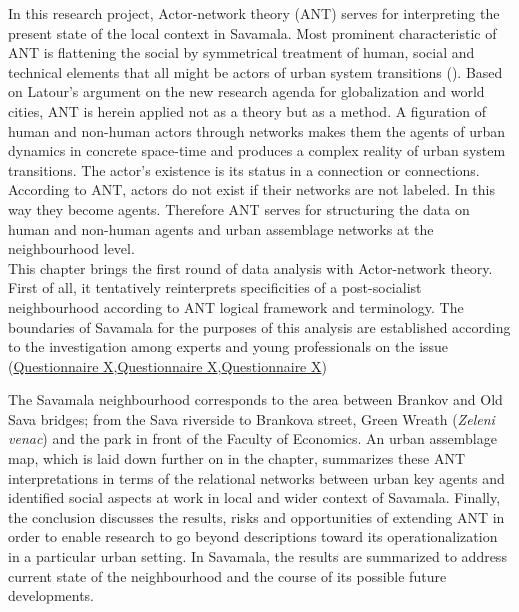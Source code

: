 \documentclass[11pt]{report}
\begin{document}
In this research project, Actor-network theory (ANT) serves for interpreting the present state of the local context in Savamala.
Most prominent characteristic of ANT is flattening the social by symmetrical treatment of human, social and technical elements that all might be actors of urban system transitions (\href{ref}{\citealt{latour_reassembling_2005}}). 
Based on Latour’s argument on the new research agenda for globalization and world cities, ANT is herein applied not as a theory but as a method.
A figuration of human and non-human actors through networks makes them the agents of urban dynamics in concrete space-time and produces a complex reality of urban system transitions. 
The actor’s existence is its status in a connection or connections.
According to ANT, actors do not exist if their networks are not labeled.
In this way they become agents.
Therefore ANT serves for structuring the data on human and non-human agents and urban assemblage networks at the neighbourhood level.
\\

This chapter brings the first round of data analysis with Actor-network theory.
First of all, it tentatively reinterprets specificities of a post-socialist neighbourhood according to ANT logical framework and terminology. 
The boundaries of Savamala for the purposes of this analysis are established according to the investigation among experts and young professionals on the issue (\href{Questionnaire Experts Savamala}{Questionnaire X},\href{Questionnaire PhD Savamala}{Questionnaire X},\href{Questionnaire Students Savamala}{Questionnaire X})

The Savamala neighbourhood corresponds to the area between Brankov and Old Sava bridges; from the Sava riverside to Brankova street, Green Wreath (\textit{Zeleni venac}) and the park in front of the Faculty of Economics.
An urban assemblage map, which is laid down further on in the chapter, summarizes these ANT interpretations in terms of the relational networks between urban key agents and identified social aspects at work in local and wider context of Savamala.
Finally, the conclusion discusses the results, risks and opportunities of extending ANT in order to enable research to go beyond descriptions toward its operationalization in a particular urban setting.
In Savamala, the results are summarized to address current state of the neighbourhood and the course of its possible future developments.
\end{document}
